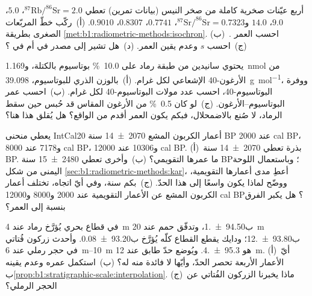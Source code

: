 \begin{exercise}[$\star\star$]\label{exo:b1:radiometric-methods:5}
أربع عيّنات صخرية كاملة من صخر النيس (بيانات تمرين) تعطي $^{87}\mathrm{Rb}/^{86}\mathrm{Sr} = 2.0$، $5.0$، $9.0$، $14.0$ و$^{87}\mathrm{Sr}/^{86}\mathrm{Sr} = 0.7323$، $0.7741$، $0.8307$، $0.9010$. (أ)~ركّب خطّ المربّعات الصغرى بطريقة \cref{met:b1:radiometric-methods:isochron}. (ب)~احسب العمر . (ج)~احسب $s$ وعدم يقين العمر. (د)~هل تشير  إلى مصدر في  أم في ؟
\end{exercise}

\begin{exercise}[$\star\star$]\label{exo:b1:radiometric-methods:6}
يحتوي سانيدين من طبقة رماد على \qty{10.0}{\percent} بوتاسيوم بالكتلة، و\qty{1.169}{nmol} من الأرغون-40 الإشعاعي لكل غرام. (أ)~بالوزن الذري للبوتاسيوم، \qty{39.098}{g.mol^{-1}}، ووفرة البوتاسيوم-40، احسب عدد مولات البوتاسيوم-40 لكل غرام. (ب)~احسب عمر البوتاسيوم–الأرغون. (ج)~لو كان \qty{0.5}{\percent} من الأرغون المقاس قد حُبس حين سقط الرماد، لا صُنع بالاضمحلال، فبكم يكون العمر أقدم من الواقع؟ هل يُقلق هذا هنا؟
\end{exercise}

\begin{exercise}[$\star\star$]\label{exo:b1:radiometric-methods:7}
يعطي منحنى IntCal20 أعمار الكربون المشع \num[uncertainty-mode=separate]{2070 \pm 14} سنة BP عند \num{2000} cal BP، و\num{7178} عند \num{8000} cal BP، و\num{10306} عند \num{12000} cal BP. (أ)~بذرة تعطي \num[uncertainty-mode=separate]{2070 \pm 14} سنة BP. ما عمرها التقويمي؟ (ب)~وأخرى تعطي \num[uncertainty-mode=separate]{2480 \pm 15} سنة BP؛ وباستعمال اللوحة اليمنى من شكل \cref{sec:b1:radiometric-methods:kar}، أعطِ مدى أعمارها التقويمية، ووضّح لماذا يكون واسعًا إلى هذا الحدّ. (ج)~بكم سنة، وفي أيّ اتجاه، تختلف أعمار الكربون المشع عن الأعمار التقويمية عند \num{2000} و\num{8000} و\num{12000} cal BP؟ هل يكبر الفرق بنسبة إلى العمر؟
\end{exercise}

\begin{exercise}[$\star\star$]\label{exo:b1:radiometric-methods:8}
في قطاع بحري يُؤرَّخ رماد عند \qty{4}{m} ب\qty[uncertainty-mode=separate]{94.50(10)}{\Ma}، وتدفّق حمم عند \qty{20}{m} ب\qty[uncertainty-mode=separate]{93.80(12)}{\Ma}؛ ودايك يقطع القطاع كلّه يُؤرَّخ ب\qty[uncertainty-mode=separate]{93.20(8)}{\Ma}. وأحدث زركون فُتاتي في حجر رملي عند \qtyrange{6}{10}{m} هو \qty[uncertainty-mode=separate]{95.3(4)}{\Ma}. ويُوضع حدّ طابق عند \qty{12}{m}. (أ)~أيّ الأعمار الأربعة تحصر الحدّ، وأيّها لا فائدة منه له؟ (ب)~استكمل عمره وعدم يقينه ب\cref{prop:b1:stratigraphic-scale:interpolation}. (ج)~ماذا يخبرنا الزركون الفُتاتي عن الحجر الرملي؟
\end{exercise}

